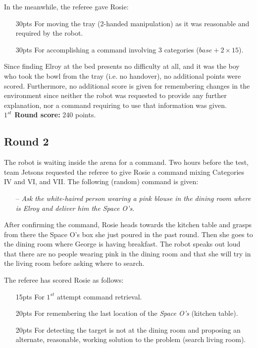 In the meanwhile, the referee gave Rosie:
\begin{itemize}
	\item[30pts] For moving the tray (2-handed manipulation) as it was reasonable and required by the robot.
	\item[30pts] For accomplishing a command involving 3 categories ($base + 2\times15$).
\end{itemize}

Since finding Elroy at the bed presents no difficulty at all, and it was the boy who took the bowl from the tray (i.e. no handover), no additional points were scored. Furthermore, no additional score is given for remembering changes in the environment since neither the robot was requested to provide any further explanation, nor a command requiring to use that information was given. \\

\textbf{$1^{st}$ Round score:} 240 points.

\subsection{Round 2}
The robot is waiting inside the arena for a command. Two hours before the test, team Jetsons requested the referee to give Rosie a command mixing Categories IV and VI, and VII. The following (random) command is given:

\begin{itemize}
	\item[--] \textit{Ask the white-haired person wearing a pink blouse in the dining room where is Elroy and deliver him the Space O's.}
\end{itemize}

After confirming the command, Rosie heads towards the kitchen table and grasps from there the Space O's box she just poured in the past round. Then she goes to the dining room where George is having breakfast. The robot speaks out loud that there are no people wearing pink in the dining room and that she will try in the living room before asking where to search.

The referee has scored Rosie as follows:
\begin{itemize}
	\item[15pts] For $1^{st}$ attempt command retrieval.
	\item[20pts] For remembering the last location of the \textit{Space O's} (kitchen table).
	\item[20pts] For detecting the target is not at the dining room and proposing an alternate, reasonable, working solution to the problem (search living room).
\end{itemize}

